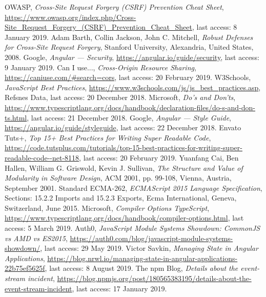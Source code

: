 \documentclass{article} %
\begin{document}
\begin{thebibliography}{9}
OWASP, \emph{Cross-Site Request Forgery (CSRF) Prevention Cheat Sheet}, \url{https://www.owasp.org/index.php/Cross-Site_Request_Forgery_(CSRF)_Prevention_Cheat_Sheet}, last access: 8 January 2019.
Adam Barth, Collin Jackson, John C. Mitchell, \emph{Robust Defenses for Cross-Site Request Forgery}, Stanford University, Alexandria, United States, 2008.
Google, \emph{Angular --- Security}, \url{https://angular.io/guide/security}, last access: 9 January 2019.
Can I use..., \emph{Cross-Origin Resource Sharing}, \url{https://caniuse.com/#search=cors}, last access: 20 February 2019.
W3Schools, \emph{JavaScript Best Practices}, \url{https://www.w3schools.com/js/js_best_practices.asp}, Refsnes Data, last access: 20 December 2018.
Microsoft, \emph{Do's and Don'ts}, \url{https://www.typescriptlang.org/docs/handbook/declaration-files/do-s-and-don-ts.html}, last access: 21 December 2018.
Google, \emph{Angular --- Style Guide}, \url{https://angular.io/guide/styleguide}, last access: 22 December 2018.
Envato Tuts+, \emph{Top 15+ Best Practices for Writing Super Readable Code}, \url{https://code.tutsplus.com/tutorials/top-15-best-practices-for-writing-super-readable-code--net-8118}, last access: 20 February 2019.
Yuanfang Cai, Ben Hallen, William G. Griswold, Kevin J. Sullivan, \emph{The Structure and Value of Modularity in Software Design}, ACM 2001, pp. 99-108, Vienna, Austria, September 2001.
Standard ECMA-262, \emph{ECMAScript 2015 Language Specification}, Sections: 15.2.2 Imports and 15.2.3 Exports, Ecma International, Geneva, Switzerland, June 2015.
Microsoft, \emph{Compiler Options TypeScript}, \url{https://www.typescriptlang.org/docs/handbook/compiler-options.html}, last access: 5 March 2019.
Auth0, \emph{JavaScript Module Systems Showdown: CommonJS vs AMD vs ES2015}, \url{https://auth0.com/blog/javascript-module-systems-showdown/}, last access: 29 May 2019.
Victor Savkin, \emph{Managing State in Angular Applications}, \url{https://blog.nrwl.io/managing-state-in-angular-applications-22b75ef5625f}, last access: 8 August 2019.
The npm Blog, \emph{Details about the event-stream incident}, \url{https://blog.npmjs.org/post/180565383195/details-about-the-event-stream-incident}, last access: 17 January 2019.

\end{thebibliography}
\end{document}
